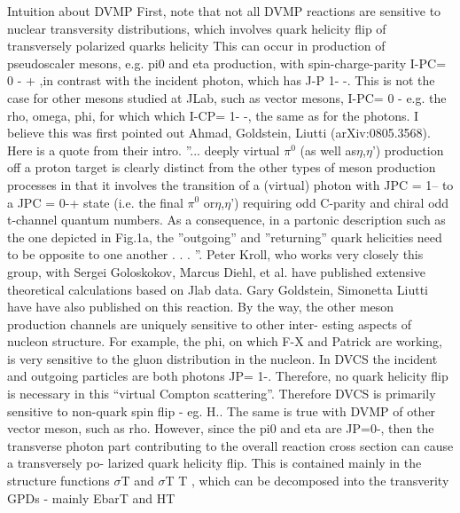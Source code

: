             Intuition about DVMP
            First, note that not all DVMP reactions are sensitive to nuclear transversity distributions,
            which involves quark helicity flip of transversely polarized quarks helicity This can occur
            in production of pseudoscaler mesons, e.g. pi0 and eta production, with spin-charge-parity
            I-PC= 0 - + ,in contrast with the incident photon, which has J-P 1- -. This is not the case
            for other mesons studied at JLab, such as vector mesons, I-PC= 0 - e.g. the rho, omega, phi,
            for which which I-CP= 1- -, the same as for the photons. I believe this was first pointed out
            Ahmad, Goldstein, Liutti (arXiv:0805.3568). Here is a quote from their intro. ”... deeply
            virtual $\pi^0$ (as well as$\eta$,$\eta$') production off a proton target is clearly distinct from the other
            types of meson production processes in that it involves the transition of a (virtual) photon
            with JPC = 1– to a JPC = 0-+ state (i.e. the final $\pi^0$ or$\eta$,$\eta$’) requiring odd C-parity and
            chiral odd t-channel quantum numbers. As a consequence, in a partonic description such
            as the one depicted in Fig.1a, the ”outgoing” and ”returning” quark helicities need to be
            opposite to one another . . . ”.
            Peter Kroll, who works very closely this group, with Sergei Goloskokov, Marcus Diehl,
            et al. have published extensive theoretical calculations based on Jlab data. Gary Goldstein,
            Simonetta Liutti have have also published on this reaction.
            By the way, the other meson production channels are uniquely sensitive to other inter-
            esting aspects of nucleon structure. For example, the phi, on which F-X and Patrick are
            working, is very sensitive to the gluon distribution in the nucleon.
            In DVCS the incident and outgoing particles are both photons JP= 1-. Therefore, no
            quark helicity flip is necessary in this “virtual Compton scattering”. Therefore DVCS is
            primarily sensitive to non-quark spin flip - eg. H.. The same is true with DVMP of other
            vector meson, such as rho. However, since the pi0 and eta are JP=0-, then the transverse
            photon part contributing to the overall reaction cross section can cause a transversely po-
            larized quark helicity flip. This is contained mainly in the structure functions $\sigma$T and $\sigma$T T ,
            which can be decomposed into the transverity GPDs - mainly EbarT and HT
            
